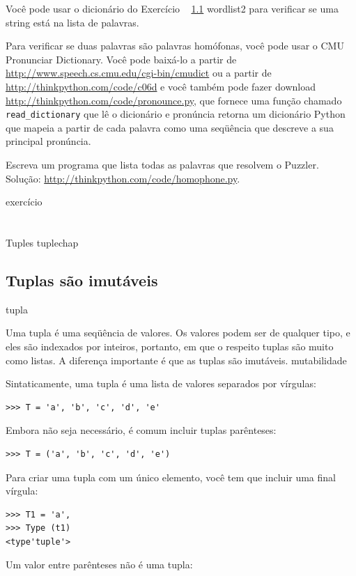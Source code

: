 \documentclass[10pt]{book}
\begin{document}
\begin{v erbatim}
\begin{}
Você pode usar o dicionário do Exercício ~ \ref {} wordlist2 para verificar
se uma string está na lista de palavras.

Para verificar se duas palavras são palavras homófonas, você pode usar o CMU
Pronunciar Dictionary. Você pode baixá-lo a partir de
\url{http://www.speech.cs.cmu.edu/cgi-bin/cmudict} ou a partir de
\url{http://thinkpython.com/code/c06d} e você também pode fazer download
\url{http://thinkpython.com/code/pronounce.py}, que fornece uma função
chamado \verb "read_dictionary" que lê o dicionário e pronúncia
retorna um dicionário Python que mapeia a partir de cada palavra como uma seqüência que
descreve a sua principal pronúncia.

Escreva um programa que lista todas as palavras que resolvem o Puzzler.
Solução: \url{http://thinkpython.com/code/homophone.py}.

\end{} exercício



\chapter{} Tuples
\label{} tuplechap

\section{Tuplas são imutáveis}
\index{} tupla

Uma tupla é uma seqüência de valores. Os valores podem ser de qualquer tipo, e
eles são indexados por inteiros, portanto, em que o respeito tuplas são muito
como listas. A diferença importante é que as tuplas são imutáveis.
\index{} mutabilidade

Sintaticamente, uma tupla é uma lista de valores separados por vírgulas:

\begin{verbatim}
>>> T = 'a', 'b', 'c', 'd', 'e'
\end{verbatim}
%
Embora não seja necessário, é comum incluir tuplas
parênteses:

\begin{verbatim}
>>> T = ('a', 'b', 'c', 'd', 'e')
\end{verbatim}
%
Para criar uma tupla com um único elemento, você tem que incluir uma final
vírgula:

\begin{verbatim}
>>> T1 = 'a',
>>> Type (t1)
<type'tuple'>
\end{verbatim}
%
Um valor entre parênteses não é uma tupla:


\end{v erbatim}
\end{document}
